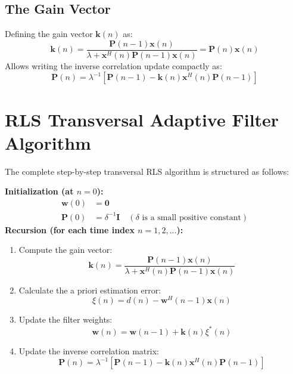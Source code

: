 \documentclass[12pt,a4paper]{article}
\begin{document}
\subsection{The Gain Vector}
Defining the gain vector $\mathbf{k}(n)$ as:
\begin{equation}
  \mathbf{k}(n) = \frac{\mathbf{P}(n-1)\mathbf{x}(n)}{\lambda + \mathbf{x}^H(n)\mathbf{P}(n-1)\mathbf{x}(n)} = \mathbf{P}(n)\mathbf{x}(n)
\end{equation}
Allows writing the inverse correlation update compactly as:
\begin{equation}
  \mathbf{P}(n) = \lambda^{-1} \left[ \mathbf{P}(n-1) - \mathbf{k}(n) \mathbf{x}^H(n) \mathbf{P}(n-1) \right]
\end{equation}

\section{RLS Transversal Adaptive Filter Algorithm}

The complete step-by-step transversal RLS algorithm is structured as follows:

\begin{tcolorbox}[defbox, title={RLS Algorithm Steps}]
\textbf{Initialization (at $n=0$):}
\begin{align}
  \mathbf{w}(0) &= \mathbf{0} \\
  \mathbf{P}(0) &= \delta^{-1} \mathbf{I} \quad (\delta \text{ is a small positive constant})
\end{align}
\textbf{Recursion (for each time index $n=1, 2, \dots$):}
\begin{enumerate}[label=\textbf{\arabic*.}, leftmargin=*, itemsep=3pt]
  \item Compute the gain vector:
  \[
    \mathbf{k}(n) = \frac{\mathbf{P}(n-1)\mathbf{x}(n)}{\lambda + \mathbf{x}^H(n)\mathbf{P}(n-1)\mathbf{x}(n)}
  \]
  \item Calculate the a priori estimation error:
  \[
    \xi(n) = d(n) - \mathbf{w}^H(n-1)\mathbf{x}(n)
  \]
  \item Update the filter weights:
  \[
    \mathbf{w}(n) = \mathbf{w}(n-1) + \mathbf{k}(n)\xi^*(n)
  \]
  \item Update the inverse correlation matrix:
  \[
    \mathbf{P}(n) = \lambda^{-1} \left[ \mathbf{P}(n-1) - \mathbf{k}(n)\mathbf{x}^H(n)\mathbf{P}(n-1) \right]
  \]
\end{enumerate}
\end{tcolorbox}
\end{document}

